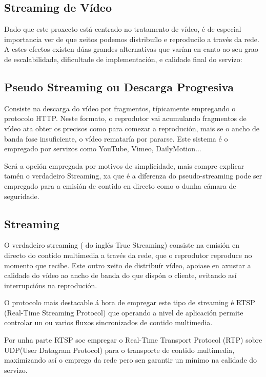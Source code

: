     \subsection{Streaming de Vídeo}
        Dado que este proxecto está centrado no tratamento de vídeo, é de especial importancia ver 
        de que xeitos podemos distribuílo e reproducilo a través da rede. A estes efectos existen dúas
        grandes alternativas que varían en canto ao seu grao de escalabilidade, dificultade de 
        implementación, e calidade final do servizo:
        
        \subsection{Pseudo Streaming ou Descarga Progresiva}
            Consiste na descarga do vídeo por fragmentos, típicamente empregando o protocolo HTTP. 
            Neste formato, o reprodutor vai acumulando fragmentos de vídeo ata obter os precisos como 
            para comezar a reprodución, mais se o ancho de banda fose insuficiente, o vídeo remataría
            por pararse. Este sistema é o empregado por servizos como YouTube, Vimeo, DailyMotion...
            
            Será a opción empregada por motivos de simplicidade, mais compre explicar tamén o verdadeiro 
            Streaming, xa que é a diferenza do pseudo-streaming pode ser empregado para a emisión de
            contido en directo como o dunha cámara de seguridade.
            
        \subsection{Streaming}
            O verdadeiro streaming ( do inglés True Streaming) consiste na emisión en directo do 
            contido multimedia a través da rede, que o reprodutor reproduce no momento que recibe.
            Este outro xeito de distribuír vídeo, apoiase en axustar a calidade do vídeo ao ancho de
            banda do que dispón o cliente, evitando así interrupcións na reprodución.
            
            O protocolo mais destacable á hora de empregar este tipo de streaming é RTSP (Real-Time
            Streaming Protocol) que operando a nivel de aplicación permite controlar un ou varios fluxos 
            sincronizados de contido multimedia.
            
            Por unha parte RTSP soe empregar o Real-Time Transport Protocol (RTP) sobre UDP(User 
            Datagram Protocol) para o transporte de contido multimedia, maximizando así o emprego 
            da rede pero sen garantir un mínimo na calidade do servizo.
            
